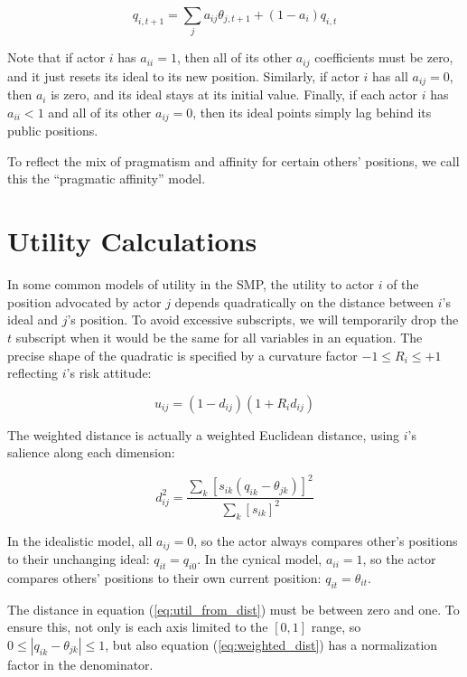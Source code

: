 \documentclass[a4paper,10pt]{article}
\begin{document}
\begin{equation} \label{eq:accomodation}
 q_{i, t+1} = \sum_{j} { a_{ij} \theta_{j, t+1} }  + (1-a_i) q_{i, t}
\end{equation}

Note that if actor $i$ has  $a_{ii} = 1$, then all of its other $a_{ij}$ coefficients must be zero,
and it just resets its ideal to its new position. Similarly, if actor $i$ has all $a_{ij} = 0$, then $a_i$ is zero, and its ideal stays at its initial value. Finally, if each
actor $i$ has  $a_{ii} < 1$ and all of its other $a_{ij} = 0$, then its ideal points simply
lag behind its public positions. 

To reflect the mix of pragmatism and affinity for certain others' positions,
we call this the ``pragmatic affinity'' model.

\section{Utility Calculations}

In some common models of utility in the SMP, the utility to actor $i$ of the position advocated by actor $j$
depends quadratically on the distance between $i$'s ideal and $j$'s position. To avoid excessive subscripts, 
we will temporarily drop the $t$ subscript when it would be the same for all variables in an equation.
The precise shape of the quadratic is specified by a curvature factor $-1 \le R_i \le +1$ reflecting $i$'s 
risk attitude:


\begin{equation} \label{eq:util_from_dist}
 u_{ij}    = (1- d_{ij}) (1+R_i d_{ij})
\end{equation}

The weighted distance is actually a  weighted Euclidean distance, using $i$'s salience along each dimension:

\begin{equation}\label{eq:weighted_dist}
  d^2_{ij}    = \frac{\sum_{k} [s_{ik} (q_{ik} - \theta_{jk})]^2 }{\sum_{k} [s_{ik}]^2 }
\end{equation}

In the idealistic model, all $a_{ij} = 0$, so the actor always compares other's positions to their 
unchanging ideal: $q_{it} = q_{i0}$. In the cynical model, $a_{ii} = 1$, so the actor 
compares others' positions
to their own current position: $q_{it} = \theta_{it}$. 
  


The distance in equation (\ref{eq:util_from_dist}) must be between zero and one. To ensure
this, not only is each
axis  limited to the $[0,1]$ range, so $ 0 \le | q_{ik} - \theta_{jk}| \le 1$, but also 
equation (\ref{eq:weighted_dist})  has a normalization
factor in the denominator.
\end{document}
